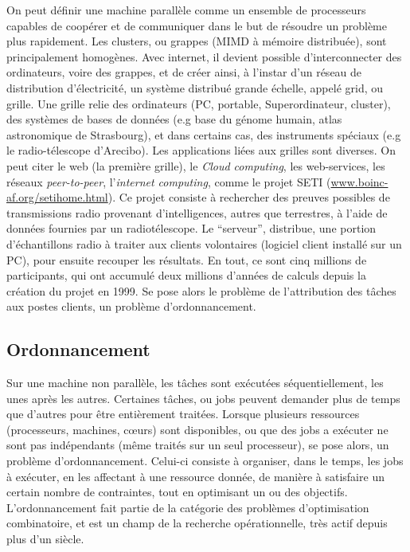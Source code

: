 \documentclass[a4paper,12pt]{report}
\theoremstyle{plain}				%
\theoremstyle{definition}				%
\newcommand{\tdi}[1]{\todo[inline]{{#1}}{}}
\newcommand{\lp}[1]{\todo[author=LP,color=yellow,inline]{#1}}
\begin{document}
On peut définir une machine parallèle comme un ensemble de processeurs
capables de coopérer et de communiquer dans le but de résoudre un
problème plus rapidement.
Les clusters, ou grappes (MIMD à mémoire distribuée), sont
principalement homogènes.
Avec internet, il devient possible d'interconnecter des ordinateurs,
voire des grappes, et de créer ainsi, à l'instar d'un réseau de
distribution d'électricité, un système distribué grande échelle,
appelé grid, ou grille.
Une grille relie des ordinateurs (PC, portable,
Superordinateur, cluster), des systèmes de bases de données
(e.g base du génome humain, atlas astronomique de Strasbourg), et dans
certains cas, des instruments spéciaux
(e.g le radio-télescope d'Arecibo).
Les applications liées aux grilles sont diverses.
On peut citer le web (la première grille), le \emph{Cloud
  computing}, les web-services, les réseaux \emph{peer-to-peer},
l'\emph{internet computing}, comme le projet SETI
(\url{www.boinc-af.org/setihome.html}).
Ce projet consiste à rechercher des preuves possibles de transmissions
radio provenant d'intelligences, autres que terrestres, à l'aide de
données fournies par un radiotélescope.
Le ``serveur'', distribue, une portion d'échantillons radio à traiter
aux clients volontaires (logiciel client installé sur un PC), pour
ensuite recouper les résultats.
En tout, ce sont cinq millions de participants, qui ont accumulé deux
millions d'années de calculs depuis la création du projet en 1999.
Se pose alors le problème de l'attribution des tâches aux postes
clients, un problème d'ordonnancement.


\subsection{Ordonnancement} \label{ssec:pesentationProblemeOrdonnancement}

Sur une machine non parallèle, les tâches sont exécutées
séquentiellement, les unes après les autres.
Certaines tâches, ou jobs peuvent demander plus de temps que d'autres
pour être entièrement traitées.
Lorsque plusieurs ressources (processeurs, machines, cœurs) sont
disponibles, ou que des jobs a exécuter ne sont pas indépendants (même
traités sur un seul processeur), se pose alors, un problème
d'ordonnancement.
Celui-ci consiste à organiser, dans le temps, les jobs à exécuter, en
les affectant à une ressource donnée, de manière à satisfaire un
certain nombre de contraintes, tout en optimisant un ou des objectifs.
L'ordonnancement fait partie de la catégorie des problèmes
d'optimisation combinatoire, et est un champ de la recherche
opérationnelle, très actif depuis plus d'un siècle.
\end{document}
